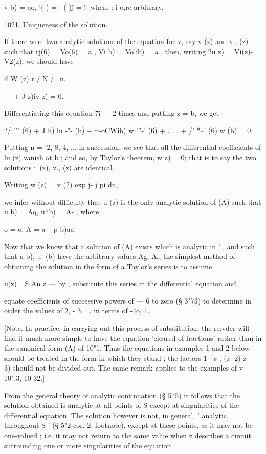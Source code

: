 v b) = ao, '( ) = | ( )j = !' where : i o,re arbitrary.

1021. Uniqueness of the solution.

If there were two analytic solutions of the equation for v, say v (z)
and v., (z) such that rj(6) = Vo(6) = a , Vi b) = Vo'ib) = a , then,
writing 2u z) = Vi(z)-V2(z), we should have

d W (z) r / N / \ n.

— + J z)iv z) = 0.

Differentiating this equation 7i — 2 times and putting z = b, we get

?/;'"' (6) + J h) lu -"- (b) + n-oCWib) w ""-' (6) + . . . + /' *--'
(6) w (b) = 0.

Putting n = '2, 8, 4, ... in succession, we see that all the
differential coefficients of lu (z) vanish at b ; and so, by Taylor's
theorem, w z) = 0; that is to say the two solutions i\ (z), v., (z)
are identical.

Writing w (z) = v (2) exp j- j pi dn,

we infer without difficulty that u (z) is the only analytic solution
of (A) such that u b) = Aq, u'ib) = A- , where

 o = o, A = a -\ p b)aa.

Now that we know that a solution of (A) exists which is analytic in '
, and such that u b), u' (b) have the arbitrary values Ag, Ai, the
simplest method of obtaining the solution in the form of a Taylor's
series is to assume

u(z)= S An z — by , substitute this series in the differential
equation and

equate coefficients of successive powers of — 6 to zero (§ 3"73) to
determine in order the values of 2, - 3, ... in terms of -4o, 1.

[Note. In practice, in carrying out this process of substitution, the
re;vder will find it much more simple to have the equation 'cleared of
fractions' rather than in the canonical form (A) of 10"1. Thus the
equations in examples 1 and 2 below should be treated in the form in
which they stand ; the factors 1 - s-, (z -2) z — 3) should not be
divided out. The same remark applies to the examples of v 10".3,
10-32.]

From the general theory of analytic continuation (§ 5*5) it follows
that the solution obtained is analytic at all points of S except at
singularities of the differential equation. The solution however is
not, in general, ' analytic throughout S ' (§ 5"2 cor. 2, footnote),
except at these points, as it may not be one-valued ; i.e. it may not
return to the same value when z describes a circuit surrounding one or
more singularities of the equation.

